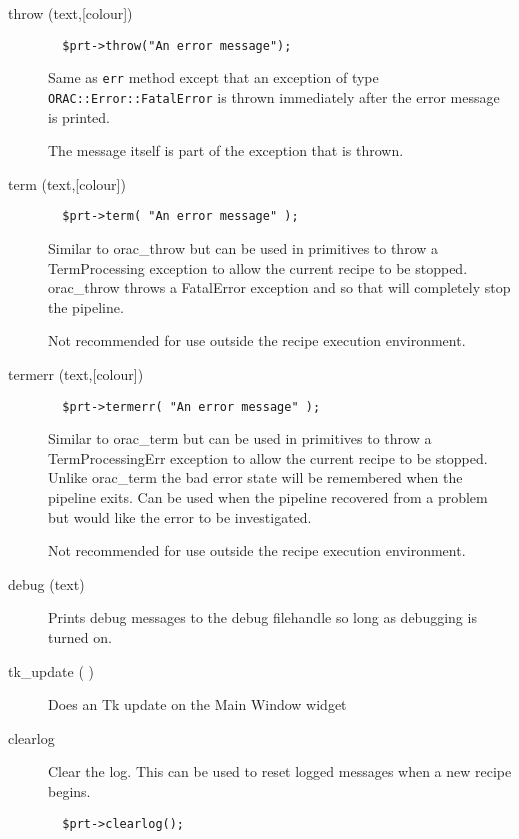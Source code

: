 \begin{description}
\item[{throw (text,[colour])}] \mbox{}\begin{verbatim}
  $prt->throw("An error message");
\end{verbatim}


Same as \texttt{err} method except that an exception of type
\texttt{ORAC::Error::FatalError} is thrown immediately after the error
message is printed.



The message itself is part of the exception that is thrown.


\item[{term (text,[colour])}] \mbox{}\begin{verbatim}
  $prt->term( "An error message" );
\end{verbatim}


Similar to orac\_throw but can be used in primitives to throw a TermProcessing
exception to allow the current recipe to be stopped. orac\_throw throws a
FatalError exception and so that will completely stop the pipeline.



Not recommended for use outside the recipe execution environment.


\item[{termerr (text,[colour])}] \mbox{}\begin{verbatim}
  $prt->termerr( "An error message" );
\end{verbatim}


Similar to orac\_term but can be used in primitives to throw a
TermProcessingErr exception to allow the current recipe to be
stopped. Unlike orac\_term the bad error state will be remembered when
the pipeline exits. Can be used when the pipeline recovered from a
problem but would like the error to be investigated.



Not recommended for use outside the recipe execution environment.


\item[{debug (text)}] \mbox{}

Prints debug messages to the debug filehandle so long as debugging
is turned on.


\item[{tk\_update ( )}] \mbox{}

Does an Tk update on the Main Window widget


\item[{clearlog}] \mbox{}

Clear the log. This can be used to reset logged messages when a new recipe
begins.

\begin{verbatim}
  $prt->clearlog();
\end{verbatim}
\end{description}
